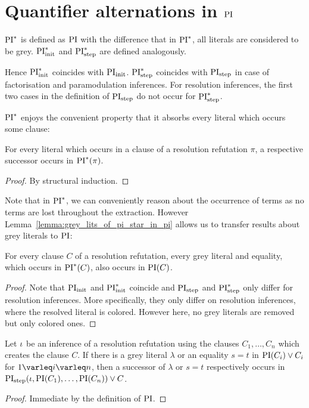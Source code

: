 \documentclass[%
	draft=false,%
	numbers=noendperiod,%
	11pt,%
	a4paper,%
	oneside,%
	openany,%
]{memoir}
\begin{document}
\section{Quantifier alternations in $\operatorname{PI}$}


\begin{defi}[$\PI^*$]
	$\PI^*$ is defined as $\operatorname{PI}$ with the difference that in $\PI^*$, all literals are considered to be grey.
	$\operatorname{PI}_{\mathrm{init}}^*$ and $\operatorname{PI}_{\mathrm{step}}^*$ are defined analogously.
\end{defi}

Hence $\operatorname{PI}_{\mathrm{init}}^*$ coincides with $\operatorname{PI}_{\mathrm{init}}$.
$\operatorname{PI}_{\mathrm{step}}^*$ coincides with $\operatorname{PI}_{\mathrm{step}}$ in case of factorisation and paramodulation inferences.
For resolution inferences, the first two cases in the definition of $\operatorname{PI}_{\mathrm{step}}$ do not occur for $\operatorname{PI}_{\mathrm{step}}^*$.

$\PI^*$ enjoys the convenient property that it absorbs every literal which occurs some clause:

\begin{prop}
	\label{prop:every_lit_in_pi_star}
	For every literal which occurs in a clause of a resolution refutation $\pi$, a respective successor occurs in $\operatorname{PI}^*(\pi)$.
\end{prop}
\begin{proof}
	By structural induction.
\end{proof}

Note that in $\PI^*$, we can conveniently reason about the occurrence of terms as no terms are lost throughout the extraction.
However Lemma~\ref{lemma:grey_lits_of_pi_star_in_pi} allows us to transfer results about grey literals to $\operatorname{PI}$:

\begin{lemma}
	\label{lemma:grey_lits_of_pi_star_in_pi}
	For every clause $C$ of a resolution refutation,
	every grey literal and equality, which occurs in $\operatorname{PI}^*(C)$, also occurs in $\operatorname{PI}(C)$.
\end{lemma}
\begin{proof}
	Note that $\operatorname{PI}_{\mathrm{init}}$ and $\operatorname{PI}_{\mathrm{init}}^*$ coincide and $\operatorname{PI}_{\mathrm{step}}$ and $\operatorname{PI}_{\mathrm{step}}^*$ only differ for resolution inferences.
	More specifically, they only differ on resolution inferences, where the resolved literal is colored. However here, no grey literals are removed but only colored ones.
\end{proof}


\begin{lemma}
	\label{lemma:Ot8Gie7y}
	Let $\iota$ be an inference of a resolution refutation using the clauses $C_1, \dots, C_n$ which creates the clause $C$.
	If there is a grey literal $\lambda$ or an equality $s=t$ in $\operatorname{PI}(C_i) \lor C_i$ for $1 \varleq i \varleq n$, 
	then a successor of $\lambda$ or $s=t$ respectively occurs in $\operatorname{PI}_{\mathrm{step}}(\iota, \operatorname{PI}(C_1), \dots, \operatorname{PI}(C_n)) \lor C$.
\end{lemma}
\begin{proof}
	Immediate by the definition of $\operatorname{PI}$.
\end{proof}
\end{document}
